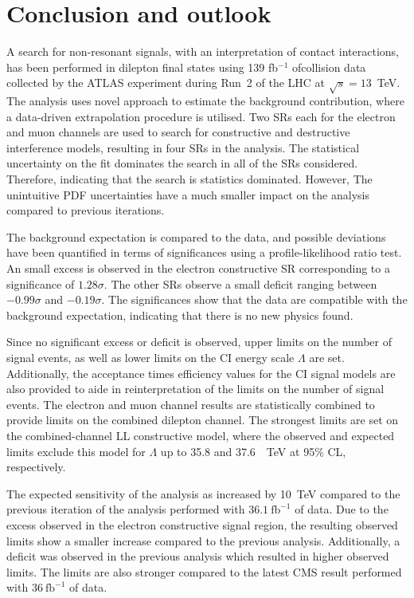 \chapter{Conclusion and outlook}\label{chap:conclusion}

A search for non-resonant signals, with an interpretation of contact interactions, has been performed in dilepton final states using 139 fb$^{-1}$ of\protonproton collision data collected by the ATLAS experiment during Run~2 of the LHC at $\sqrt{s}=13$~TeV. The analysis uses novel approach to estimate the background contribution, where a data-driven extrapolation procedure is utilised. Two SRs each for the electron and muon channels are used to search for constructive and destructive interference models, resulting in four SRs in the analysis. The statistical uncertainty on the fit dominates the search in all of the SRs considered. Therefore, indicating that the search is statistics dominated. However, The unintuitive PDF uncertainties have a much smaller impact on the analysis compared to previous iterations. 

The background expectation is compared to the data, and possible deviations have been quantified in terms of significances using a profile-likelihood ratio test. An small excess is observed in the electron constructive SR corresponding to a significance of $1.28\sigma$. The other SRs observe a small deficit ranging between $-0.99\sigma$ and $ -0.19\sigma$. The significances show that the data are compatible with the background expectation, indicating that there is no new physics found. 

Since no significant excess or deficit is observed, upper limits on the number of signal events, as well as lower limits on the CI energy scale $\Lambda$ are set. Additionally, the acceptance times efficiency values for the CI signal models are also provided to aide in reinterpretation of the limits on the number of signal events. The electron and muon channel results are statistically combined to provide limits on the combined dilepton channel. The strongest limits are set on the combined-channel LL constructive model, where the observed and expected limits exclude this model for $\Lambda$ up to 35.8 and 37.6~\SI{}{\tera\electronvolt} at 95\% CL, respectively. 

The expected sensitivity of the analysis as increased by \SI{10}{\tera\electronvolt} compared to the previous iteration of the analysis performed with $\SI{36.1}{\femto\barn}^{-1}$ of data. Due to the excess observed in the electron constructive signal region, the resulting  observed limits show a smaller increase compared to the previous analysis. Additionally, a deficit was observed in the previous analysis which resulted in higher observed limits. The limits are also stronger compared to the latest CMS result performed with $\SI{36}{\femto\barn}^{-1}$ of data. 

